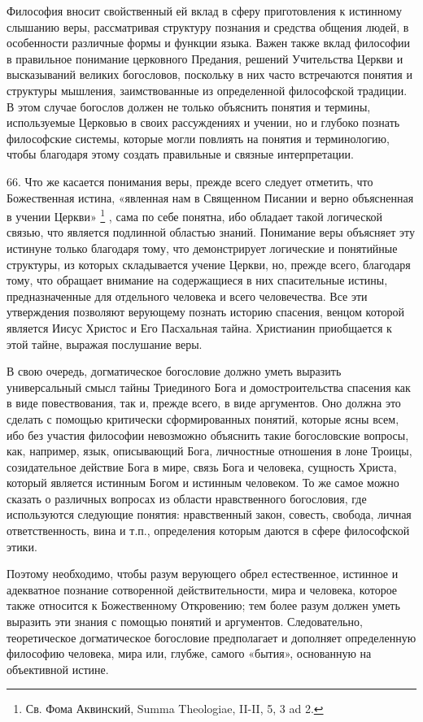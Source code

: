 \documentclass[a5paper,10pt]{article}
\begin{document}
Философия вносит свойственный ей вклад в сферу приготовления к истинному
слышанию веры, рассматривая структуру познания и средства общения людей, в
особенности различные формы и функции языка. Важен также вклад философии в
правильное понимание церковного Предания, решений Учительства Церкви и
высказываний великих богословов, поскольку в них часто встречаются понятия и
структуры мышления, заимствованные из определенной философской традиции. В этом
случае богослов должен не только объяснить понятия и термины, используемые
Церковью в своих рассуждениях и учении, но и глубоко познать философские
системы, которые могли повлиять на понятия и терминологию, чтобы благодаря
этому создать правильные и связные интерпретации.

66. Что же касается понимания веры, прежде всего следует отметить, что
Божественная истина, «явленная нам в Священном Писании и верно объясненная в
учении Церкви» \footnote{Св. Фома Аквинский, Summa Theologiae, II-II, 5, 3 ad
2.} , сама по себе понятна, ибо обладает такой логической связью, что является
подлинной областью знаний. Понимание веры объясняет эту истинуне только
благодаря тому, что демонстрирует логические и понятийные структуры, из которых
складывается учение Церкви, но, прежде всего, благодаря тому, что обращает
внимание на содержащиеся в них спасительные истины, предназначенные для
отдельного человека и всего человечества. Все эти утверждения позволяют
верующему познать историю спасения, венцом которой является Иисус Христос и Его
Пасхальная тайна. Христианин приобщается к этой тайне, выражая послушание веры.

В свою очередь, догматическое богословие должно уметь выразить универсальный
смысл тайны Триединого Бога и домостроительства спасения как в виде
повествования, так и, прежде всего, в виде аргументов. Оно должна это сделать с
помощью критически сформированных понятий, которые ясны всем, ибо без участия
философии невозможно объяснить такие богословские вопросы, как, например, язык,
описывающий Бога, личностные отношения в лоне Троицы, созидательное действие
Бога в мире, связь Бога и человека, сущность Христа, который является истинным
Богом и истинным человеком. То же самое можно сказать о различных вопросах из
области нравственного богословия, где используются следующие понятия:
нравственный закон, совесть, свобода, личная ответственность, вина и т.п.,
определения которым даются в сфере философской этики.

Поэтому необходимо, чтобы разум верующего обрел естественное, истинное и
адекватное познание сотворенной действительности, мира и человека, которое
также относится к Божественному Откровению; тем более разум должен уметь
выразить эти знания с помощью понятий и аргументов. Следовательно,
теоретическое догматическое богословие предполагает и дополняет определенную
философию человека, мира или, глубже, самого «бытия», основанную на объективной
истине.
\end{document}
